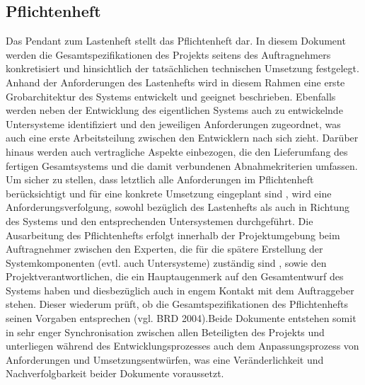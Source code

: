 \subsection{Pflichtenheft}
Das Pendant zum Lastenheft stellt das Pflichtenheft dar. 
In diesem Dokument werden die Gesamtspezifikationen des Projekts seitens des Auftragnehmers konkretisiert und hinsichtlich der tatsächlichen technischen Umsetzung festgelegt. Anhand der Anforderungen des Lastenhefts wird in diesem Rahmen eine erste Grobarchitektur des Systems entwickelt und geeignet beschrieben. Ebenfalls werden neben der Entwicklung des eigentlichen Systems auch zu entwickelnde 
Untersysteme identifiziert und den jeweiligen Anforderungen zugeordnet, was auch eine erste Arbeitsteilung zwischen den Entwicklern nach sich zieht. Darüber hinaus werden auch vertragliche Aspekte einbezogen, die den Lieferumfang des fertigen Gesamtsystems und die damit verbundenen Abnahmekriterien umfassen. Um sicher zu stellen, dass letztlich alle Anforderungen im Pflichtenheft berücksichtigt und für eine konkrete Umsetzung eingeplant sind
, wird eine Anforderungsverfolgung, sowohl bezüglich des Lastenhefts als auch in Richtung des Systems und den entsprechenden Untersystemen durchgeführt. Die Ausarbeitung des Pflichtenhefts erfolgt innerhalb der Projektumgebung beim Auftragnehmer zwischen den Experten, die für die spätere Erstellung der Systemkomponenten (evtl. auch Untersysteme) zuständig sind
, sowie den Projektverantwortlichen, die ein Hauptaugenmerk auf den Gesamtentwurf des Systems haben und diesbezüglich auch in engem Kontakt mit dem Auftraggeber stehen. Dieser wiederum prüft, ob die Gesamtspezifikationen des Pflichtenhefts seinen Vorgaben entsprechen (vgl. BRD 2004).Beide Dokumente entstehen somit in sehr 
enger Synchronisation zwischen allen Beteiligten des Projekts und unterliegen während des Entwicklungsprozesses auch dem Anpassungsprozess von Anforderungen und Umsetzungsentwürfen, was eine Veränderlichkeit und Nachverfolgbarkeit beider Dokumente voraussetzt.

\cite{brd-lastenheft}
